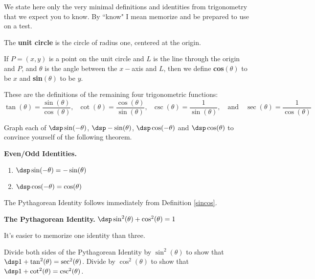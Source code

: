 We state here only the very minimal definitions and identities from trigonometry that we expect you to know.  By ``know" I mean memorize and be prepared to use on a test.

\begin{dfn}
The \textbf{unit circle} is the circle of radius one, centered at the origin.
\end{dfn}

\begin{dfn} \label{sincos}
If $P=(x,y)$ is a point on the unit circle and $L$ is the line through the origin and $P$, and $\theta$ is the angle between the $x-$axis and $L$, then we define \textbf{cos}$(\theta)$ to be $x$ and \textbf{sin}$(\theta)$ to be $y$.
\end{dfn}

\begin{dfn} These are the definitions of the remaining four trigonometric functions:
$$\tan(\theta )=\frac{\sin(\theta )}{\cos(\theta )}, \ \ \ \cot(\theta )=\frac{\cos(\theta )}{\sin(\theta )}, \ \ \ \csc(\theta )=\frac{1}{\sin(\theta )}, \ \ \ \mbox{ and }\ \ \ \sec(\theta )=\frac{1}{\cos(\theta)}$$
\end{dfn}

\begin{prb}
Graph each of $\dsp \sin(-\theta )$, $\dsp -\sin(\theta )$, $\dsp \cos(-\theta )$ and $\dsp \cos(\theta )$ to convince yourself of the following theorem.
\end{prb}

\begin{thm} \textbf{Even/Odd Identities.}
\begin{enumerate}
\item $\dsp \sin(-\theta )=-\sin(\theta )$
\item  $\dsp \cos(-\theta )=\cos(\theta )$
\end{enumerate}
\end{thm}

The Pythagorean Identity follows immediately from Definition \ref{sincos}.

\begin{thm} \textbf{The Pythagorean Identity.}
$\dsp \sin^{2}(\theta )+\cos^{2}(\theta )=1$
\end{thm}

\begin{axm}
It's easier to memorize one identity than three.
\end{axm}

\begin{prb}
 Divide both sides of the Pythagorean Identity by $\sin^2(\theta)$ to show that $\dsp 1+\tan^{2}(\theta )=\sec^{2}(\theta )$.  Divide by $\cos^2(\theta)$ to show that $\dsp 1+\cot^{2}(\theta )=\csc^{2}(\theta )$.
\end{prb}

